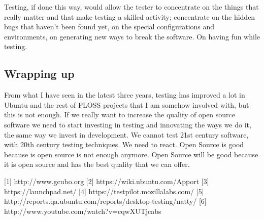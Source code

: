 Testing, if done this way, would allow the tester to concentrate on the things that really matter and that make testing a skilled activity; concentrate on the hidden bugs that haven't been found yet, on the special configurations and environments, on generating new ways to break the software. On having fun while testing.

\subsection*{Wrapping up}

From what I have seen in the latest three years, testing has improved a lot in Ubuntu and the rest of FLOSS projects that I am somehow involved with, but this is not enough. If we really want to increase the quality of open source software we need to start investing in testing and innovating the ways we do it, the same way we invest in development. We cannot test 21st century software, with 20th century testing techniques. We need to react. Open Source is good because is open source is not enough anymore. Open Source will be good because it is open source and has the best quality that we can offer.


[1] http://www.gcubo.org
[2] https://wiki.ubuntu.com/Apport
[3] https://launchpad.net/
[4] https://testpilot.mozillalabs.com/
[5] http://reports.qa.ubuntu.com/reports/desktop-testing/natty/
[6] http://www.youtube.com/watch?v=cqwXUTjcabs